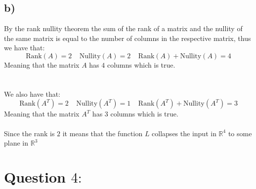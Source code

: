 \documentclass{article}
\begin{document}
\subsection*{b)}
By the rank nullity theorem the sum of the rank of a matrix and the nullity of the same matrix is equal to the number of columns in the respective matrix, thus we have that: 
$$\text{Rank}(A)=2\;\;\;\;\text{Nullity}(A)=2\;\;\;\;\text{Rank}(A)+\text{Nullity}(A)=4$$
Meaning that the matrix $A$ has $4$ columns which is true.\\\\\\
We also have that: 
$$\text{Rank}(A^T)=2\;\;\;\;\text{Nullity}(A^T)=1\;\;\;\;\text{Rank}(A^T)+\text{Nullity}(A^T)=3$$
Meaning that the matrix $A^T$ has 3 columns which is true.\\\\Since the rank is $2$ it means that the function $L$ collapses the input in $\mathbb{R}^4$ to some plane in $\mathbb{R}^3$
\newpage
\section*{Question $4:$}
\end{document}
